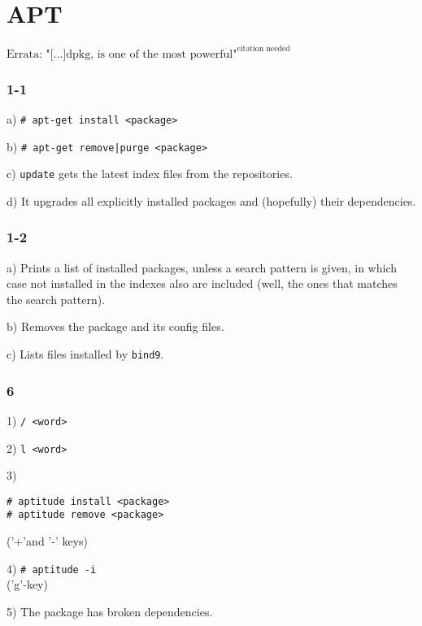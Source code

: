 \chapter{APT}
$\text{Errata: "[...]dpkg, is one of the most powerful"}^{\text{citation needed}}$
\subsection{1-1}
a) \verb=# apt-get install <package>=

b) \verb=# apt-get remove|purge <package>=

c) \verb=update= gets the latest index files from the repositories.

d) It upgrades all explicitly installed packages and (hopefully) their dependencies.

\subsection{1-2}
a) Prints a list of installed packages, unless a search pattern is given, in which case not installed in the indexes also are included (well, the ones that matches the search pattern).

b) Removes the package and its config files.

c) Lists files installed by \verb=bind9=.


%



\subsection{6}
1) \verb=/ <word>=

2) \verb=l <word>=

3) \begin{verbatim}# aptitude install <package>
# aptitude remove <package>\end{verbatim}
('+'and '-' keys)

4) \verb=# aptitude -i=\\
('g'-key)

5) The package has broken dependencies.
